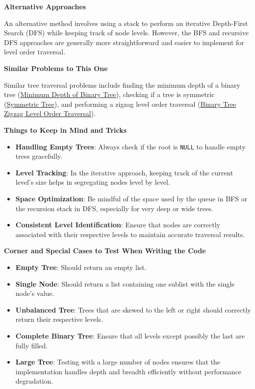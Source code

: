 \textbf{Alternative Approaches}

An alternative method involves using a stack to perform an iterative Depth-First Search (DFS) while keeping track of node levels. However, the BFS and recursive DFS approaches are generally more straightforward and easier to implement for level order traversal.

\textbf{Similar Problems to This One}

Similar tree traversal problems include finding the minimum depth of a binary tree (\hyperref[problem:minimum_depth_of_binary_tree]{Minimum Depth of Binary Tree}), checking if a tree is symmetric (\hyperref[problem:symmetric_tree]{Symmetric Tree}), and performing a zigzag level order traversal (\hyperref[problem:binary_tree_zigzag_level_order_traversal]{Binary Tree Zigzag Level Order Traversal}).

\textbf{Things to Keep in Mind and Tricks}

\begin{itemize}
    \item \textbf{Handling Empty Trees}: Always check if the root is \texttt{NULL} to handle empty trees gracefully.
    \item \textbf{Level Tracking}: In the iterative approach, keeping track of the current level's size helps in segregating nodes level by level.
    \item \textbf{Space Optimization}: Be mindful of the space used by the queue in BFS or the recursion stack in DFS, especially for very deep or wide trees.
    \item \textbf{Consistent Level Identification}: Ensure that nodes are correctly associated with their respective levels to maintain accurate traversal results.
\end{itemize}

\textbf{Corner and Special Cases to Test When Writing the Code}

\begin{itemize}
    \item \textbf{Empty Tree}: Should return an empty list.
    \item \textbf{Single Node}: Should return a list containing one sublist with the single node's value.
    \item \textbf{Unbalanced Tree}: Trees that are skewed to the left or right should correctly return their respective levels.
    \item \textbf{Complete Binary Tree}: Ensure that all levels except possibly the last are fully filled.
    \item \textbf{Large Tree}: Testing with a large number of nodes ensures that the implementation handles depth and breadth efficiently without performance degradation.
\end{itemize}